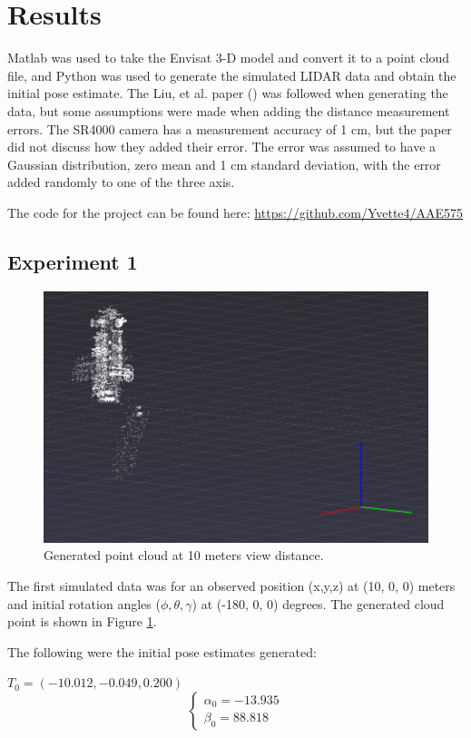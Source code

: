 \documentclass[conference]{IEEEtran}
\begin{document}
	\section{Results}
		Matlab was used to take the Envisat 3-D model and convert it to a point cloud file, and Python was used to generate the simulated LIDAR data and obtain the initial pose estimate. The Liu, et al. paper (\cite{liu2016point}) was followed when generating the data, but some assumptions were made when adding the distance measurement errors. The SR4000 camera has a measurement accuracy of 1 cm, but the paper did not discuss how they added their error. The error was assumed to have a Gaussian distribution, zero mean and 1 cm standard deviation, with the error added randomly to one of the three axis.
		
		The code for the project can be found here: \url{https://github.com/Yvette4/AAE575}
		
	\subsection{Experiment 1}
		\begin{figure}[htbp]
			\centerline{\includegraphics[scale=1]{Images/Experiment1_10m.PNG}}
			\caption{Generated point cloud at 10 meters view distance.}
			\label{Experiment1pc}
		\end{figure}
		The first simulated data was for an observed position (x,y,z) at (10, 0, 0) meters and initial rotation angles ($\phi, \theta, \gamma$) at (-180, 0, 0) degrees. The generated cloud point is shown in Figure \ref{Experiment1pc}.
		
		The following were the initial pose estimates generated:
		\begin{center}
			$T_0 = (-10.012, -0.049,0.200)$
			\[
			\begin{cases}
				\alpha_0 = -13.935 \\
				\beta_0 = 88.818
			\end{cases}
			\]
		\end{center}
		
\end{document}
